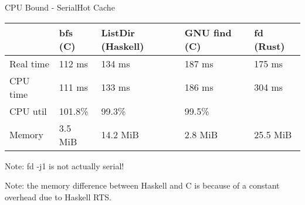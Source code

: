 \documentclass[17pt]{beamer}
\begin{document}
\begin{frame}{CPU Bound - Serial}{Hot Cache}
\tiny



\begin{tabular}{|l|l|l|l|l|}
\hline
  & bfs (C) & ListDir (Haskell) & GNU find (C) & fd (Rust) \\
\hline
  Real time & 112 ms & 134 ms & 187 ms & 175 ms \\
\hline
  CPU time & 111 ms & 133 ms & 186 ms & 304 ms \\
\hline
  CPU util & 101.8\% & 99.3\% & 99.5\% & \color{red}{173.7\%} \\
\hline
  Memory & 3.5 MiB & 14.2 MiB & 2.8 MiB & 25.5 MiB\\
\hline
\end{tabular}

Note: fd -j1 is not actually serial!

Note: the memory difference between Haskell and C is because of a constant
overhead due to Haskell RTS.

\end{frame}

%
\end{document}
